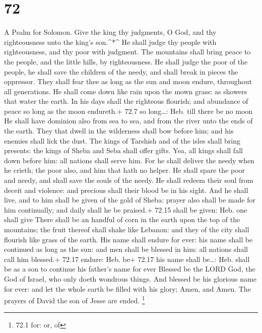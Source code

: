 \hypertarget{section-71}{%
\section{72}\label{section-71}}

A Psalm for Solomon.  Give the king thy judgments, O God,
and thy righteousness unto the king's son.\^{}*\^{}  He
shall judge thy people with righteousness, and thy poor with judgment.
 The mountains shall bring peace to the people, and the
little hills, by righteousness.  He shall judge the poor of
the people, he shall save the children of the needy, and shall break in
pieces the oppressor.  They shall fear thee as long as the
sun and moon endure, throughout all generations.  He shall
come down like rain upon the mown grass: as showers that water the
earth.  In his days shall the righteous flourish; and
abundance of peace so long as the moon endureth.+ 72.7 so long\ldots:
Heb. till there be no moon  He shall have dominion also from
sea to sea, and from the river unto the ends of the earth. 
They that dwell in the wilderness shall bow before him; and his enemies
shall lick the dust.  The kings of Tarshish and of the
isles shall bring presents: the kings of Sheba and Seba shall offer
gifts.  Yea, all kings shall fall down before him: all
nations shall serve him.  For he shall deliver the needy
when he crieth; the poor also, and him that hath no helper.
 He shall spare the poor and needy, and shall save the
souls of the needy.  He shall redeem their soul from deceit
and violence: and precious shall their blood be in his sight.
 And he shall live, and to him shall be given of the gold
of Sheba: prayer also shall be made for him continually; and daily shall
he be praised.+ 72.15 shall be given: Heb. one shall give 
There shall be an handful of corn in the earth upon the top of the
mountains; the fruit thereof shall shake like Lebanon: and they of the
city shall flourish like grass of the earth.  His name
shall endure for ever: his name shall be continued as long as the sun:
and men shall be blessed in him: all nations shall call him blessed.+
72.17 endure: Heb. be+ 72.17 his name shall be\ldots: Heb. shall be as a
son to continue his father's name for ever  Blessed be the
LORD God, the God of Israel, who only doeth wondrous things.
 And blessed be his glorious name for ever: and let the
whole earth be filled with his glory; Amen, and Amen.  The
prayers of David the son of Jesse are ended. \footnote{72.1 for: or, of}

